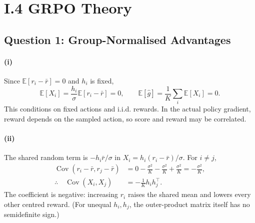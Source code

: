 \section{I.4 GRPO Theory}

\subsection{Question 1: Group-Normalised Advantages}

\paragraph{(i)}
Since $\mathbb{E}[r_i-\bar r]=0$ and $h_i$ is fixed,
\begin{equation}
 \mathbb{E}[X_i]=\frac{h_i}{\sigma}\mathbb{E}[r_i-\bar r]=0,
 \qquad \mathbb{E}[\hat g]=\frac{1}{K}\sum_i\mathbb{E}[X_i]=0.
\end{equation}
This conditions on fixed actions and i.i.d. rewards.  In the actual policy gradient,
reward depends on the sampled action, so score and reward may be correlated.

\paragraph{(ii)}
The shared random term is $-h_i\bar r/\sigma$ in
$X_i=h_i(r_i-\bar r)/\sigma$.  For $i\ne j$,
\begin{align}
 \operatorname{Cov}(r_i-\bar r,r_j-\bar r)
 &=0-\frac{\sigma^2}{K}-\frac{\sigma^2}{K}+\frac{\sigma^2}{K}
 =-\frac{\sigma^2}{K},\\
 \therefore\quad \operatorname{Cov}(X_i,X_j)
 &=-\frac{1}{K}h_i h_j^\top .
 \label{eq:q1-cross-cov}
\end{align}
The coefficient is negative: increasing $r_i$ raises the shared mean and lowers every
other centred reward.  (For unequal $h_i,h_j$, the outer-product matrix itself has no
semidefinite sign.)

